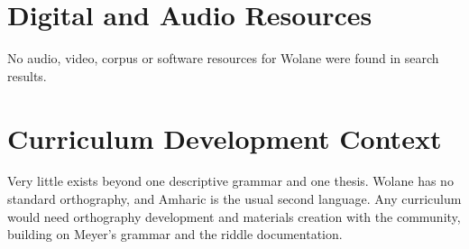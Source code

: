 \documentclass[12pt]{article}
\begin{document}
\section{Digital and Audio Resources}
No audio, video, corpus or software resources for Wolane were found in search results.

\section{Curriculum Development Context}
Very little exists beyond one descriptive grammar and one thesis. Wolane has no standard orthography, and Amharic is the usual second language. Any curriculum would need orthography development and materials creation with the community, building on Meyer's grammar and the riddle documentation.
\end{document}
